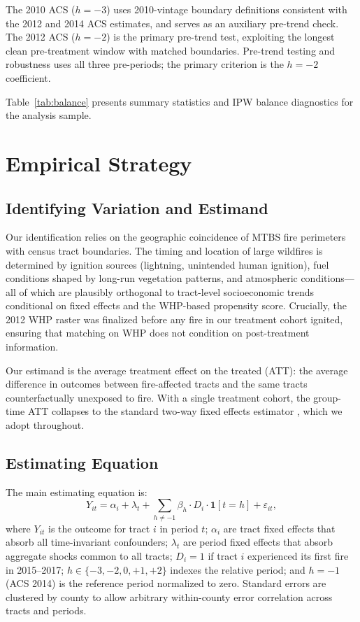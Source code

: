 \documentclass[12pt]{article}
\begin{document}
The 2010 ACS ($h = -3$) uses 2010-vintage boundary definitions consistent
with the 2012 and 2014 ACS estimates, and serves as an
auxiliary pre-trend check.
The 2012 ACS ($h = -2$) is the primary pre-trend test,
exploiting the longest clean pre-treatment window with matched boundaries.
Pre-trend testing and robustness uses all three pre-periods;
the primary criterion is the $h = -2$ coefficient.

Table~\ref{tab:balance} presents summary statistics and IPW balance
diagnostics for the analysis sample.


\section{Empirical Strategy}
\label{sec:strategy}

\subsection{Identifying Variation and Estimand}

Our identification relies on the geographic coincidence of MTBS fire
perimeters with census tract boundaries.
The timing and location of large wildfires is determined by
ignition sources (lightning, unintended human ignition),
fuel conditions shaped by long-run vegetation patterns,
and atmospheric conditions---all of which are plausibly
orthogonal to tract-level socioeconomic trends conditional on
fixed effects and the WHP-based propensity score.
Crucially, the 2012 WHP raster was finalized before any fire in our
treatment cohort ignited, ensuring that matching on WHP does not
condition on post-treatment information.

Our estimand is the average treatment effect on the treated (ATT):
the average difference in outcomes between fire-affected tracts
and the same tracts counterfactually unexposed to fire.
With a single treatment cohort, the \citet{callaway2021difference}
group-time ATT collapses to the standard two-way fixed effects estimator
\citep{goodman2021difference}, which we adopt throughout.

\subsection{Estimating Equation}

The main estimating equation is:
\begin{equation}
  Y_{it} = \alpha_i + \lambda_t
    + \sum_{h \neq -1} \beta_h \cdot D_i \cdot \mathbf{1}[t = h]
    + \varepsilon_{it},
  \label{eq:main}
\end{equation}
where $Y_{it}$ is the outcome for tract $i$ in period $t$;
$\alpha_i$ are tract fixed effects that absorb all time-invariant
confounders;
$\lambda_t$ are period fixed effects that absorb aggregate shocks
common to all tracts;
$D_i = 1$ if tract $i$ experienced its first fire in 2015--2017;
$h \in \{-3, -2, 0, +1, +2\}$ indexes the relative period;
and $h = -1$ (ACS 2014) is the reference period normalized to zero.
Standard errors are clustered by county to allow arbitrary
within-county error correlation across tracts and periods.
\end{document}
